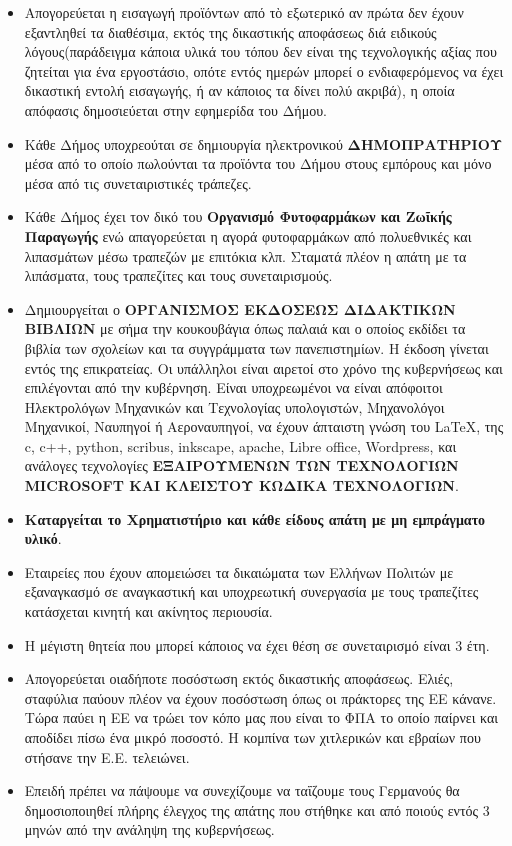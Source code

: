 \documentclass[a4paper]{article}
\begin{document}
\begin{itemize}
\item Απογορεύεται η εισαγωγή προϊόντων από τὸ εξωτερικό αν πρώτα δεν έχουν εξαντληθεί τα διαθέσιμα, εκτός της δικαστικής αποφάσεως διά ειδικούς λόγους(παράδειγμα κάποια υλικά του τόπου δεν είναι της τεχνολογικής αξίας που ζητείται για ένα εργοστάσιο, οπότε εντός ημερών μπορεί ο ενδιαφερόμενος να έχει δικαστική εντολή εισαγωγής, ή αν κάποιος τα δίνει πολύ ακριβά), η οποία απόφασις δημοσιεύεται στην εφημερίδα του Δήμου.
\item Κάθε Δήμος υποχρεούται σε δημιουργία ηλεκτρονικού \textbf{ΔΗΜΟΠΡΑΤΗΡΙΟΥ} μέσα από το οποίο πωλούνται τα προϊόντα του Δήμου στους εμπόρους και μόνο μέσα από τις συνεταιριστικές τράπεζες. 
\item Κάθε Δήμος έχει τον δικό του \textbf{Οργανισμό Φυτοφαρμάκων και Ζωῖκής Παραγωγής} ενώ απαγορεύεται η αγορά φυτοφαρμάκων από πολυεθνικές και λιπασμάτων μέσω τραπεζών με επιτόκια κλπ. Σταματά πλέον η απάτη με τα λιπάσματα, τους τραπεζίτες και τους συνεταιρισμούς.
\item Δημιουργείται ο \textbf{ΟΡΓΑΝΙΣΜΟΣ ΕΚΔΟΣΕΩΣ ΔΙΔΑΚΤΙΚΩΝ ΒΙΒΛΙΩΝ} με σήμα την κουκουβάγια όπως παλαιά και ο οποίος εκδίδει τα βιβλία των σχολείων και τα συγγράμματα των πανεπιστημίων. Η έκδοση γίνεται εντός της επικρατείας. Οι υπάλληλοι είναι αιρετοί στο χρόνο της κυβερνήσεως και επιλέγονται από την κυβέρνηση. Είναι υποχρεωμένοι να είναι απόφοιτοι Ηλεκτρολόγων Μηχανικών και Τεχνολογίας υπολογιστών, Μηχανολόγοι Μηχανικοί, Ναυπηγοί ή Αεροναυπηγοί, να έχουν άπταιστη γνώση του \LaTeX, της c, c++, python, scribus, inkscape, apache, Libre office, Wordpress, και ανάλογες τεχνολογίες \textbf{ΕΞΑΙΡΟΥΜΕΝΩΝ ΤΩΝ ΤΕΧΝΟΛΟΓΙΩΝ MICROSOFT ΚΑΙ ΚΛΕΙΣΤΟΥ ΚΩΔΙΚΑ ΤΕΧΝΟΛΟΓΙΩΝ}.
\item \textbf{Καταργείται το Χρηματιστήριο και κάθε είδους απάτη με μη εμπράγματο υλικό}. 
\item Εταιρείες που έχουν απομειώσει τα δικαιώματα των Ελλήνων Πολιτών με εξαναγκασμό σε αναγκαστική και υποχρεωτική συνεργασία με τους τραπεζίτες κατάσχεται κινητή και ακίνητος περιουσία.
\item Η μέγιστη θητεία που μπορεί κάποιος να έχει θέση σε συνεταιρισμό είναι 3 έτη.
\item Απογορεύεται οιαδήποτε ποσόστωση εκτός δικαστικής αποφάσεως. Ελιές, σταφύλια παύουν πλέον να έχουν ποσόστωση όπως οι πράκτορες της ΕΕ κάνανε. Τώρα παύει η ΕΕ να τρώει τον κόπο μας που είναι το ΦΠΑ το οποίο παίρνει και αποδίδει πίσω ένα μικρό ποσοστό. Η κομπίνα των χιτλερικών και εβραίων που στήσανε την Ε.Ε. τελειώνει.
\item Επειδή πρέπει να πάψουμε να συνεχίζουμε να ταΐζουμε τους Γερμανούς θα δημοσιοποιηθεί πλήρης έλεγχος της απάτης που στήθηκε και από ποιούς εντός 3 μηνών από την ανάληψη της κυβερνήσεως.

\end{itemize}
\end{document}

